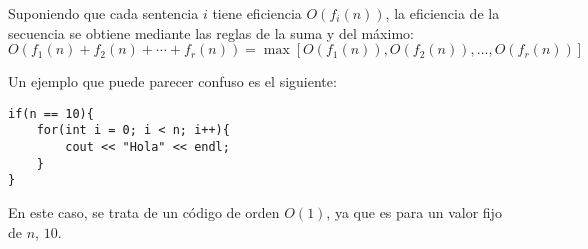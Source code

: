 Suponiendo que cada sentencia $i$ tiene eficiencia $O(f_i(n))$, la eficiencia de la secuencia se obtiene mediante las reglas de la suma y del máximo:
\begin{equation*}
O(f_1(n) + f_2(n) + \cdots + f_r(n)) = \max\left[O(f_1(n)), O(f_2(n)), \ldots, O(f_r(n))\right]
\end{equation*}

\begin{ejemplo}
Un ejemplo que puede parecer confuso es el siguiente:
\begin{listing}
    \begin{verbatim}
if(n == 10){
    for(int i = 0; i < n; i++){
        cout << "Hola" << endl;
    }
}
    \end{verbatim}
\end{listing}

En este caso, se trata de un código de orden $O(1)$, ya que es para un valor fijo de $n$, $10$. 
\end{ejemplo}

